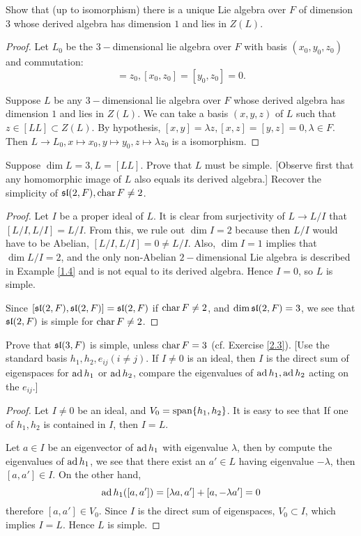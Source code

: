 \begin{ex}
  Show that (up to isomorphism) there is a unique Lie algebra over $F$ of dimension $3$ whose derived algebra has dimension $1$ and lies in $Z(L)$.
\end{ex}
\begin{proof}
  Let $L_0$ be the $3-$dimensional lie algebra over $F$ with basis $(x_0, y_0, z_0)$ and commutation:
  \begin{equation*}
    [x_0, y_0] = z_0, [x_0, z_0] = [y_0, z_0] = 0.
  \end{equation*}

  Suppose $L$ be any $3-$dimensional lie algebra over $F$ whose derived algebra has dimension $1$ and lies in $Z(L)$. We can take a basis $(x, y, z)$ of $L$ such that $z \in [LL] \subset Z(L)$. By hypothesis, $[x, y] = \lambda z, [x, z] = [y, z] =0, \lambda\in F$. Then $L \to L_0, x \mapsto x_0, y \mapsto y_0, z \mapsto \lambda z_0$ is a isomorphism.
\end{proof}

\begin{ex}
  Suppose $\dim L = 3,L = [LL]$. Prove that $L$ must be simple. [Observe first that any homomorphic image of $L$ also equals its derived algebra.] Recover the simplicity of $\sl(2, F), \Char F \neq 2$.
\end{ex}
\begin{proof}
  Let $I$ be a proper ideal of $L$. It is clear from surjectivity of $L \to L/I$ that $[L/I, L/I] = L/I$. From this, we rule out $\dim I = 2$ because then $L/I$ would have to be Abelian, $[L/I, L/I] = 0 \neq L/I$. Also, $\dim I = 1$ implies that $\dim L/I = 2$, and the only non-Abelian $2-$dimensional Lie algebra is described in Example \ref{1.4} and is not equal to its derived algebra. Hence $I = 0$, so $L$ is simple.

  Since $[\sl(2, F), \sl(2, F)] = \sl(2, F)$ if $\Char F \neq 2$, and $\dim\sl(2, F) = 3$, we see that $\sl(2, F)$ is simple for $\Char F \neq 2$.
\end{proof}

\begin{ex}
  Prove that $\sl(3, F)$ is simple, unless $\Char F = 3$ (cf. Exercise \ref{2.3}). [Use the standard basis $h_1, h_2, e_{ij}(i \neq j)$. If $I \neq 0$ is an ideal, then $I$ is the direct sum of eigenspaces for $\ad h_1$ or $\ad h_2$, compare the eigenvalues of $\ad h_1, \ad h_2$ acting on the $e_{ij}$.]
\end{ex}
\begin{proof}
  Let $I\neq 0$ be an ideal, and $V_0=\Span\{h_1,h_2\}$. It is easy to see that If one of $h_1,h_2$ is contained in $I$, then $I=L$.

  Let $a\in I$ be an eigenvector of $\ad h_1$ with eigenvalue $\lambda$, then by compute the eigenvalues of $\ad h_1$, we see that there exist an $a'\in L$ having eigenvalue $-\lambda$, then $[a,a']\in I$. On the other hand,
  \begin{equation*}
    \ad h_1 ([a,a']) = [\lambda a,a']+[a,-\lambda a']=0
  \end{equation*}
  therefore $[a,a']\in V_0$. Since $I$ is the direct sum of eigenspaces, $V_0\subset I$, which implies $I=L$. Hence $L$ is simple.
\end{proof}

